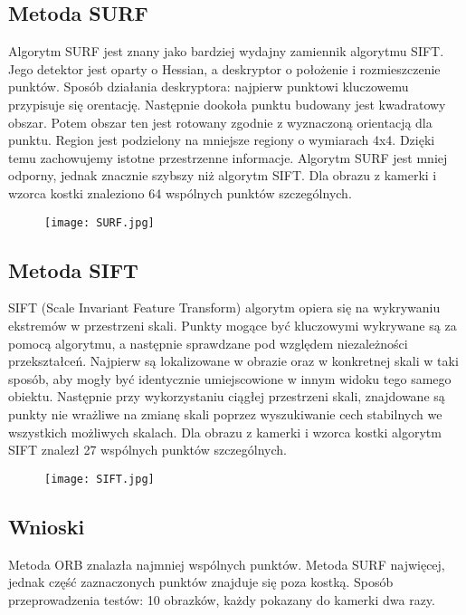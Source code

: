 \documentclass[polish,a4paper]{article}
\begin{document}
\subsection{Metoda SURF}
Algorytm SURF jest znany jako bardziej wydajny zamiennik algorytmu SIFT. Jego detektor jest oparty o Hessian, a deskryptor o położenie i rozmieszczenie punktów. Sposób działania deskryptora: najpierw punktowi kluczowemu przypisuje się orentację. Następnie dookoła punktu budowany jest kwadratowy obszar. Potem obszar ten jest rotowany zgodnie z wyznaczoną orientacją dla punktu. Region jest podzielony na mniejsze regiony o wymiarach 4x4. Dzięki temu zachowujemy istotne przestrzenne informacje. Algorytm SURF jest mniej odporny, jednak znacznie szybszy niż algorytm SIFT\cite{keypoint}.
\newline
\newline
Dla obrazu z kamerki i wzorca kostki znaleziono 64 wspólnych punktów szczególnych. 
\begin{figure}[H]
\centering
\texttt{[image: SURF.jpg]}
\end{figure} 
\newpage
\subsection{Metoda SIFT}
SIFT (Scale Invariant Feature Transform) algorytm opiera się na wykrywaniu ekstremów w przestrzeni skali. Punkty mogące być kluczowymi wykrywane są za pomocą algorytmu, a następnie sprawdzane pod względem niezależności przekształceń\cite{sift}. Najpierw są lokalizowane w obrazie oraz w konkretnej skali w taki sposób, aby mogły być identycznie umiejscowione w innym widoku tego samego obiektu. Następnie przy wykorzystaniu ciągłej przestrzeni skali, znajdowane są punkty nie wrażliwe na zmianę skali poprzez wyszukiwanie cech stabilnych we wszystkich możliwych skalach\cite{keypoint}. 
\newline
\newline
Dla obrazu z kamerki i wzorca kostki algorytm SIFT znalezł 27 wspólnych punktów szczególnych. 
\begin{figure}[H]
\centering
\texttt{[image: SIFT.jpg]}
\end{figure} 
\subsection{Wnioski}
Metoda ORB znalazła najmniej wspólnych punktów. Metoda SURF najwięcej, jednak część zaznaczonych punktów znajduje się poza kostką.  
\newline
\newline
Sposób przeprowadzenia testów: 
10 obrazków, każdy pokazany do kamerki dwa razy.
\end{document}
